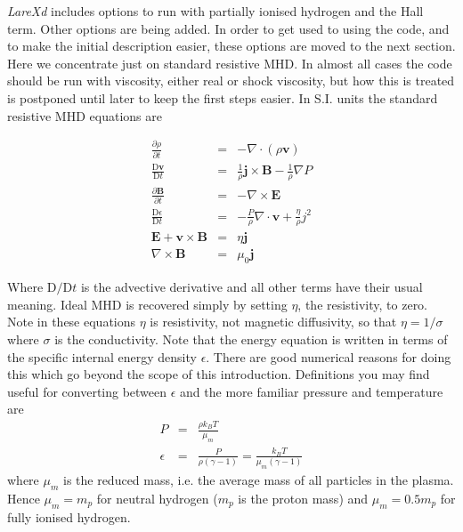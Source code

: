 \documentclass[11pt]{article}
\begin{document}
{\it LareXd} includes options to run with partially ionised hydrogen and the Hall term. Other options are being added. In order to get used to using the code, and to make the initial description easier, these options are moved to the next section. Here we concentrate just on standard resistive MHD. In almost all cases the code should be run with viscosity, either real or shock viscosity, but how this is treated is postponed until later to keep the first steps easier. In S.I. units the standard resistive MHD equations are

\begin{eqnarray}
\frac{\partial \rho}{\partial t}&=&- \nabla\cdot(\rho \mathbf{v})\\
\frac{\mathrm{D}\mathbf{v}}{\mathrm{D}t}&=&\frac{1}{\rho}\mathbf{j}\times\mathbf{B}
-\frac{1}{\rho}\nabla P\\
\frac{\partial \mathbf{B}}{\partial t}&=&-\nabla\times\mathbf{E} \label{faraday}\\
\frac{\mathrm{D}\epsilon}{\mathrm{D}t}&=&-\frac{P}{\rho}\nabla\cdot\mathbf{v}+\frac
{\eta}{\rho}j^{2}\\
\mathbf{E}+\mathbf{v}\times\mathbf{B}&=&\eta \mathbf{j} \label{ohm}\\
\nabla\times\mathbf{B}&=&\mu_0 \mathbf{j}
\end{eqnarray}

Where $\mathrm{D}/\mathrm{D}t$ is the advective derivative and all other terms have their usual meaning. Ideal MHD is recovered simply by setting $\eta$, the resistivity, to zero. Note in these equations $\eta$ is resistivity, not magnetic diffusivity, so that $\eta=1/\sigma$ where $\sigma$ is the conductivity. Note that the energy equation is written in terms of the specific internal energy density $\epsilon$. There are good numerical reasons for doing this which go beyond the scope of this introduction. Definitions you may find useful for converting between $\epsilon$ and the more familiar pressure and temperature are
\begin{eqnarray*}
P&=&\frac{\rho k_{B}T}{\mu_m}\\
\epsilon&=&\frac{P}{\rho(\gamma-1)}=\frac{k_B T}{\mu_m (\gamma-1)}
\end{eqnarray*}
where $\mu_m$ is the reduced mass, i.e. the average mass of all particles in the plasma. Hence $\mu_m=m_p$ for neutral hydrogen ($m_p$ is the proton mass) and $\mu_m=0.5 m_p$ for fully ionised hydrogen. 
\end{document}
